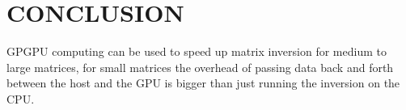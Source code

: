 
\section{CONCLUSION}
\label{sec:conclusion}

GPGPU computing can be used to speed up matrix inversion for medium to large matrices, for small matrices the overhead of passing data back and forth between the host and the GPU is bigger than just running the inversion on the CPU.